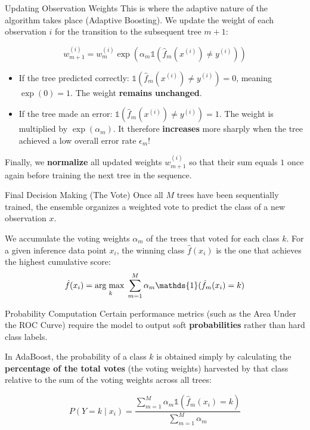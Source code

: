 \begin{frame}{Updating Observation Weights}
	This is where the adaptive nature of the algorithm takes place (Adaptive Boosting). We update the weight of each observation $i$ for the transition to the subsequent tree $m+1$:
	
	\begin{equation*}
		w_{m+1}^{(i)} = w_m^{(i)} \exp\left(\alpha_m \mathds{1}(\hat{f}_m(x^{(i)}) \neq y^{(i)})\right)
	\end{equation*}
	
	\pause
	\begin{itemize}
		\item If the tree predicted correctly: $\mathds{1}(\hat{f}_m(x^{(i)}) \neq y^{(i)}) = 0$, meaning $\exp(0) = 1$. The weight \textbf{remains unchanged}.
		\item If the tree made an error: $\mathds{1}(\hat{f}_m(x^{(i)}) \neq y^{(i)}) = 1$. The weight is multiplied by $\exp(\alpha_m)$. It therefore \textbf{increases} more sharply when the tree achieved a low overall error rate $\epsilon_m$!
	\end{itemize}
	
	\vspace{0.3cm}
	Finally, we \textbf{normalize} all updated weights $w_{m+1}^{(i)}$ so that their sum equals $1$ once again before training the next tree in the sequence.
\end{frame}

\begin{frame}{Final Decision Making (The Vote)}
	Once all $M$ trees have been sequentially trained, the ensemble organizes a weighted vote to predict the class of a new observation $x$.
	
	\vspace{0.5cm}
	We accumulate the voting weights $\alpha_m$ of the trees that voted for each class $k$. For a given inference data point $x_i$, the winning class $\hat{f}(x_i)$ is the one that achieves the highest cumulative score:	
	\begin{equation*}
		\hat{f}(x_i) = \argmax{k} \sum_{m=1}^M \alpha_m \mathds{1}(\hat{f}_m(x_i) = k)
	\end{equation*}
\end{frame}

\begin{frame}{Probability Computation}
	Certain performance metrics (such as the Area Under the ROC Curve) require the model to output soft \textbf{probabilities} rather than hard class labels.
	
	\vspace{0.5cm}
	In AdaBoost, the probability of a class $k$ is obtained simply by calculating the \textbf{percentage of the total votes} (the voting weights) harvested by that class relative to the sum of the voting weights across all trees:
	
	\begin{equation*}
		P(Y = k \mid x_i) = \frac{\sum_{m=1}^M \alpha_m \mathds{1}(\hat{f}_m(x_i) = k)}{\sum_{m=1}^M \alpha_m}
	\end{equation*}
	
\end{frame}

